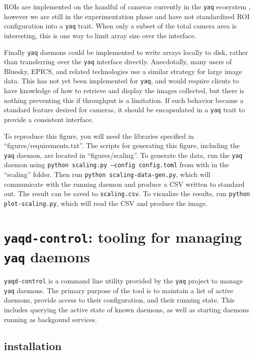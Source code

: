 \documentclass[11pt, full]{article}
\newcommand\yaq{\texttt{yaq}}
\let\stdsection\section
\renewcommand\section{\clearpage\stdsection}
\begin{document}
ROIs are implemented on the handful of cameras currently in the \yaq{} ecosystem \cite{yaqd_andor,yaqd_pi}, however we are still in the experimentation phase and have not standardized ROI configuration into a \yaq{} trait.
When only a subset of the total camera area is interesting, this is one way to limit array size over the interface.

Finally \yaq{} daemons could be implemented to write arrays locally to disk, rather than transferring over the \yaq{} interface directly.
Anecdotally, many users of Bluesky, EPICS, and related technologies use a similar strategy for large image data.
This has not yet been implemented for \yaq{}, and would require clients to have knowledge of how to retrieve and display the images collected, but there is nothing preventing this if throughput is a limitation.
If such behavior became a standard feature desired for cameras, it should be encapsulated in a \yaq{} trait to provide a consistent interface.

To reproduce this figure, you will need the libraries specified in ``figures/requirements.txt''.
The scripts for generating this figure, including the \yaq{} daemon, are located in ``figures/scaling''.
To generate the data, run the \yaq{} daemon using \texttt{python scaling.py --config config.toml} from with in the ``scaling'' folder.
Then run \texttt{python scaling-data-gen.py}, which will communicate with the running daemon and produce a CSV written to standard out.
The result can be saved to \texttt{scaling.csv}.
To visualize the results, run \texttt{python plot-scaling.py}, which will read the CSV and produce the image.

\clearpage

\section{\texttt{yaqd-control}: tooling for managing \yaq{} daemons}

\texttt{yaqd-control} is a command line utility provided by the \yaq{} project to manage \yaq{} daemons.
The primary purpose of the tool is to maintain a list of active daemons, provide access to their configuration, and their running state.
This includes querying the active state of known daemons, as well as starting daemons running as backgound services.

\subsection{installation}
\end{document}
